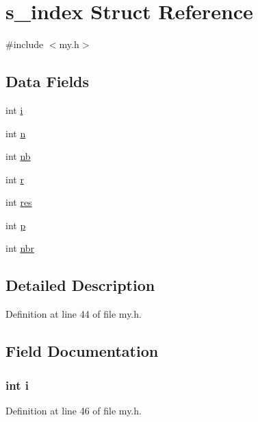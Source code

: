 \hypertarget{structs__index}{\section{s\+\_\+index Struct Reference}
\label{structs__index}
}


{\ttfamily \#include $<$my.\+h$>$}

\subsection*{Data Fields}
\begin{DoxyCompactItemize}
\item 
int \hyperlink{structs__index_acb559820d9ca11295b4500f179ef6392}{i}
\item 
int \hyperlink{structs__index_a76f11d9a0a47b94f72c2d0e77fb32240}{n}
\item 
int \hyperlink{structs__index_ab310c6afcc676eab3930dce2650511c0}{nb}
\item 
int \hyperlink{structs__index_acab531abaa74a7e664e3986f2522b33a}{r}
\item 
int \hyperlink{structs__index_aac31eb68bff694554a182bd796b2f1c5}{res}
\item 
int \hyperlink{structs__index_a533391314665d6bf1b5575e9a9cd8552}{p}
\item 
int \hyperlink{structs__index_a8dd0ad1e89c554ecb23740525af3dc5d}{nbr}
\end{DoxyCompactItemize}


\subsection{Detailed Description}


Definition at line 44 of file my.\+h.



\subsection{Field Documentation}
\hypertarget{structs__index_acb559820d9ca11295b4500f179ef6392}{
\subsubsection[{i}]{\setlength{\rightskip}{0pt plus 5cm}int i}}\label{structs__index_acb559820d9ca11295b4500f179ef6392}


Definition at line 46 of file my.\+h.

